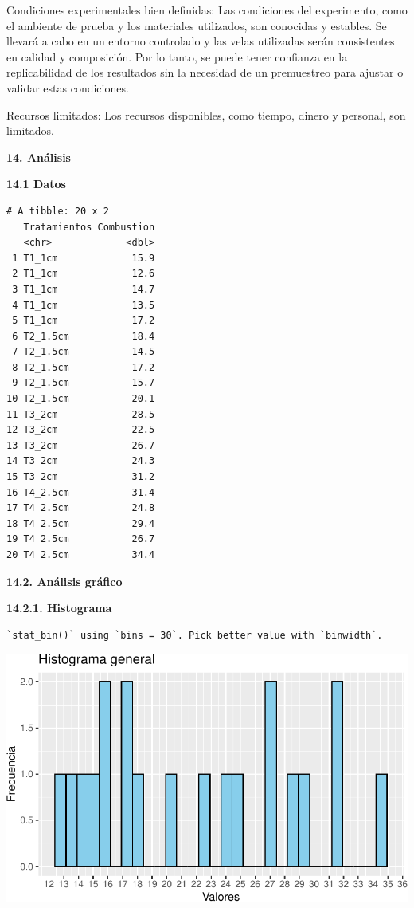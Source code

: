 \documentclass[
  letterpaper,
  DIV=11,
  numbers=noendperiod]{scrartcl}
\begin{document}
Condiciones experimentales bien definidas: Las condiciones del
experimento, como el ambiente de prueba y los materiales utilizados, son
conocidas y estables. Se llevará a cabo en un entorno controlado y las
velas utilizadas serán consistentes en calidad y composición. Por lo
tanto, se puede tener confianza en la replicabilidad de los resultados
sin la necesidad de un premuestreo para ajustar o validar estas
condiciones.

Recursos limitados: Los recursos disponibles, como tiempo, dinero y
personal, son limitados.

\textbf{14. Análisis}

\textbf{14.1 Datos}

\begin{verbatim}
# A tibble: 20 x 2
   Tratamientos Combustion
   <chr>             <dbl>
 1 T1_1cm             15.9
 2 T1_1cm             12.6
 3 T1_1cm             14.7
 4 T1_1cm             13.5
 5 T1_1cm             17.2
 6 T2_1.5cm           18.4
 7 T2_1.5cm           14.5
 8 T2_1.5cm           17.2
 9 T2_1.5cm           15.7
10 T2_1.5cm           20.1
11 T3_2cm             28.5
12 T3_2cm             22.5
13 T3_2cm             26.7
14 T3_2cm             24.3
15 T3_2cm             31.2
16 T4_2.5cm           31.4
17 T4_2.5cm           24.8
18 T4_2.5cm           29.4
19 T4_2.5cm           26.7
20 T4_2.5cm           34.4
\end{verbatim}

\textbf{14.2. Análisis gráfico}

\textbf{14.2.1. Histograma}

\begin{verbatim}
`stat_bin()` using `bins = 30`. Pick better value with `binwidth`.
\end{verbatim}

\includegraphics{Documento_files/figure-pdf/unnamed-chunk-2-1.pdf}
\end{document}
